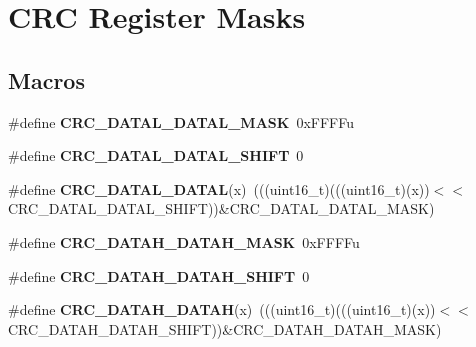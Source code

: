 \hypertarget{group__CRC__Register__Masks}{}\section{C\+RC Register Masks}
\label{group__CRC__Register__Masks}
\subsection*{Macros}
\begin{DoxyCompactItemize}
\item 
\#define {\bfseries C\+R\+C\+\_\+\+D\+A\+T\+A\+L\+\_\+\+D\+A\+T\+A\+L\+\_\+\+M\+A\+SK}~0x\+F\+F\+F\+Fu\hypertarget{group__CRC__Register__Masks_ga8bad59d8f638bc49c5c098b0be9beb23}{}\label{group__CRC__Register__Masks_ga8bad59d8f638bc49c5c098b0be9beb23}

\item 
\#define {\bfseries C\+R\+C\+\_\+\+D\+A\+T\+A\+L\+\_\+\+D\+A\+T\+A\+L\+\_\+\+S\+H\+I\+FT}~0\hypertarget{group__CRC__Register__Masks_ga99d9068960a7ec56ab525b22628d74ee}{}\label{group__CRC__Register__Masks_ga99d9068960a7ec56ab525b22628d74ee}

\item 
\#define {\bfseries C\+R\+C\+\_\+\+D\+A\+T\+A\+L\+\_\+\+D\+A\+T\+AL}(x)~(((uint16\+\_\+t)(((uint16\+\_\+t)(x))$<$$<$C\+R\+C\+\_\+\+D\+A\+T\+A\+L\+\_\+\+D\+A\+T\+A\+L\+\_\+\+S\+H\+I\+FT))\&C\+R\+C\+\_\+\+D\+A\+T\+A\+L\+\_\+\+D\+A\+T\+A\+L\+\_\+\+M\+A\+SK)\hypertarget{group__CRC__Register__Masks_ga5aa800e3872374aae006a458ac46e48e}{}\label{group__CRC__Register__Masks_ga5aa800e3872374aae006a458ac46e48e}

\item 
\#define {\bfseries C\+R\+C\+\_\+\+D\+A\+T\+A\+H\+\_\+\+D\+A\+T\+A\+H\+\_\+\+M\+A\+SK}~0x\+F\+F\+F\+Fu\hypertarget{group__CRC__Register__Masks_ga8d8b84bf7b81a4943bfe4d92eea7a83d}{}\label{group__CRC__Register__Masks_ga8d8b84bf7b81a4943bfe4d92eea7a83d}

\item 
\#define {\bfseries C\+R\+C\+\_\+\+D\+A\+T\+A\+H\+\_\+\+D\+A\+T\+A\+H\+\_\+\+S\+H\+I\+FT}~0\hypertarget{group__CRC__Register__Masks_ga2820b1c312342051ef13af454924dd6a}{}\label{group__CRC__Register__Masks_ga2820b1c312342051ef13af454924dd6a}

\item 
\#define {\bfseries C\+R\+C\+\_\+\+D\+A\+T\+A\+H\+\_\+\+D\+A\+T\+AH}(x)~(((uint16\+\_\+t)(((uint16\+\_\+t)(x))$<$$<$C\+R\+C\+\_\+\+D\+A\+T\+A\+H\+\_\+\+D\+A\+T\+A\+H\+\_\+\+S\+H\+I\+FT))\&C\+R\+C\+\_\+\+D\+A\+T\+A\+H\+\_\+\+D\+A\+T\+A\+H\+\_\+\+M\+A\+SK)\hypertarget{group__CRC__Register__Masks_ga1a935b7a0739c9353ea1db915d15098f}{}\label{group__CRC__Register__Masks_ga1a935b7a0739c9353ea1db915d15098f}


\end{DoxyCompactItemize}
